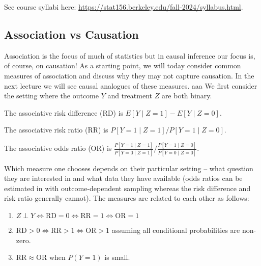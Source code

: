See course syllabi here: \href{https://stat156.berkeley.edu/fall-2024/syllabus.html}{https://stat156.berkeley.edu/fall-2024/syllabus.html}.

\subsection{Association vs Causation}

Association is the focus of much of statistics but in causal inference our focus is, of course, on causation! As a starting point, we will today consider common measures of association and discuss why they may not capture causation. In the next lecture we will see causal analogues of these measures.
aaa
We first consider the setting where the outcome $Y$ and treatment $Z$ are both binary. 

\begin{definition}
    The associative risk difference (RD) is $E[Y \mid Z = 1] - E[Y \mid Z = 0]$.
\end{definition}


\begin{definition}
    The associative risk ratio (RR) is $P[Y =1 \mid Z = 1]/P[Y =1 \mid Z = 0]$.
\end{definition}

\begin{definition}
    The associative odds ratio (OR) is $\frac{P[Y =1 \mid Z = 1]}{P[Y =0 \mid Z = 1]}/\frac{P[Y=1 \mid Z = 0]}{P[Y=0 \mid Z = 0]}$.
\end{definition}

Which measure one chooses depends on their particular setting -- what question they are interested in and what data they have available (odds ratios can be estimated in with outcome-dependent sampling whereas the risk difference and risk ratio generally cannot). The measures are related to each other as follows:

\begin{enumerate}
    \item $Z \perp Y  \Longleftrightarrow \mathrm{RD} = 0 \Longleftrightarrow \mathrm{RR} = 1 \Longleftrightarrow \mathrm{OR} = 1$
    \item $\mathrm{RD} > 0 \Longleftrightarrow \mathrm{RR} > 1 \Longleftrightarrow \mathrm{OR} > 1$ assuming all conditional probabilities are non-zero.
    \item $\mathrm{RR} \approx \mathrm{OR}$ when $P(Y=1)$ is small.
\end{enumerate}

